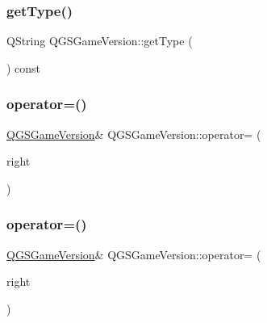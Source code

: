 \mbox{\label{class_q_g_s_game_version_a1abab1e471d3b73a1f2fd8d06eaeddb5}} 
\subsubsection{\texorpdfstring{get\+Type()}{getType()}}
{\footnotesize\ttfamily Q\+String Q\+G\+S\+Game\+Version\+::get\+Type (\begin{DoxyParamCaption}{ }\end{DoxyParamCaption}) const}

\mbox{\label{class_q_g_s_game_version_a73e3b1597dfcfe65ca400dab9ed13a31}} 
\subsubsection{\texorpdfstring{operator=()}{operator=()}\hspace{0.1cm}{\footnotesize\ttfamily [1/2]}}
{\footnotesize\ttfamily \mbox{\hyperlink{class_q_g_s_game_version}{Q\+G\+S\+Game\+Version}}\& Q\+G\+S\+Game\+Version\+::operator= (\begin{DoxyParamCaption}\item[{const \mbox{\hyperlink{class_q_g_s_game_version}{Q\+G\+S\+Game\+Version}} \&}]{right }\end{DoxyParamCaption})\hspace{0.3cm}{\ttfamily [default]}}

\mbox{\label{class_q_g_s_game_version_a56cb03144a983256c4721b7f6ab5eaaf}} 
\subsubsection{\texorpdfstring{operator=()}{operator=()}\hspace{0.1cm}{\footnotesize\ttfamily [2/2]}}
{\footnotesize\ttfamily \mbox{\hyperlink{class_q_g_s_game_version}{Q\+G\+S\+Game\+Version}}\& Q\+G\+S\+Game\+Version\+::operator= (\begin{DoxyParamCaption}\item[{\mbox{\hyperlink{class_q_g_s_game_version}{Q\+G\+S\+Game\+Version}} \&\&}]{right }\end{DoxyParamCaption})\hspace{0.3cm}{\ttfamily [default]}}

